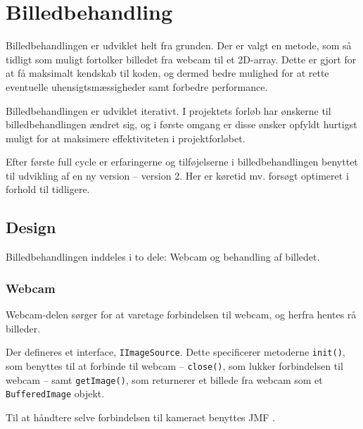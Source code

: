 \chapter{Billedbehandling}\label{cha:ip}
Billedbehandlingen er udviklet helt fra grunden. Der er valgt en metode, som så tidligt som muligt fortolker billedet fra webcam til et 2D-array. Dette er gjort for at få maksimalt kendskab til koden, og dermed bedre mulighed for at rette eventuelle uhensigtsmæssigheder samt forbedre performance.

Billedbehandlingen er udviklet iterativt. I projektets forløb har ønskerne til billedbehandlingen ændret sig, og i første omgang er disse ønsker opfyldt hurtigst muligt for at maksimere effektiviteten i projektforløbet.

Efter første full cycle er erfaringerne og tilføjelserne i billedbehandlingen benyttet til udvikling af en ny version -- version 2. Her er køretid mv. forsøgt optimeret i forhold til tidligere.

\section{Design}
Billedbehandlingen inddeles i to dele: Webcam og behandling af billedet.

\subsection{Webcam}
Webcam-delen sørger for at varetage forbindelsen til webcam, og herfra hentes rå billeder.

Der defineres et interface, \texttt{IImageSource}. Dette specificerer metoderne \texttt{init()}, som benyttes til at forbinde til webcam -- \texttt{close()}, som lukker forbindelsen til webcam -- samt \texttt{getImage()}, som returnerer et billede fra webcam som et \texttt{BufferedImage} objekt.

Til at håndtere selve forbindelsen til kameraet benyttes JMF .

